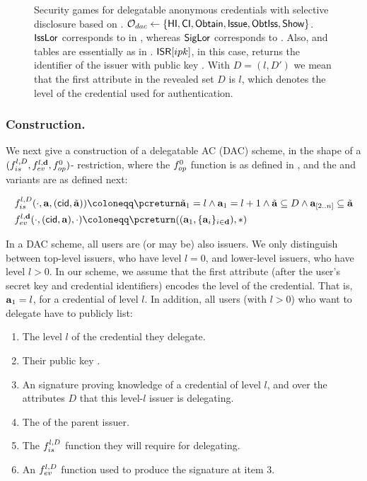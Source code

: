 \begin{figure}[ht!]
{  }
  \caption{Security games for delegatable anonymous credentials with selective
    disclosure based on \cite{fhs19}. $\mathcal{O}_{dac} \gets \lbrace
    \mathsf{HI},\mathsf{CI},\mathsf{Obtain},\mathsf{Issue},\mathsf{ObtIss},
    \mathsf{Show}\rbrace$. $\mathsf{IssLor}$ corresponds to \OBTCHALb in \UAS,
    whereas $\mathsf{SigLor}$ corresponds to \CHALb. Also, \OWNR
    and \ATTR tables are essentially as in .
    $\mathsf{ISR}[ipk]$, in this case, returns the identifier of the issuer with public
    key \ipk. With $D = (l,D')$ we mean that the first attribute in the revealed
    set $D$ is $l$, which denotes the level of the credential used for
    authentication.}
  \label{fig:model-dac}  
\end{figure}

\subsubsection{\CUASDAC Construction.} %
We next give a construction of a delegatable AC (DAC) scheme, in the shape of
a $(f_{is}^{l,D},f_{ev}^{l,\mathbf{d}},f_{op}^0)$-\CUASGenInt
restriction, where the $f_{op}^0$ function is as defined in
, and the \fissue and \feval variants are as
defined next:

\begin{align}
  & \fissue^{l,D}(\cdot,\attrs,(\cid,\cattrs)) \coloneqq
    \pcreturn \cattrs_1 = l \land \attrs_1 = l+1
    \land \cattrs \subseteq D \land \attrs_{[2..n]} \subseteq \cattrs \nonumber \\
  & \feval^{l,\dattrs}(\cdot,(\cid,\attrs),\cdot) \coloneqq
    \pcreturn((\attrs_1,\lbrace\attrs_i\rbrace_{i\in\dattrs}),\ast)
    \label{eq:funcs-dac}
\end{align}

In a DAC scheme, all users are (or may be) also issuers. We only
distinguish between top-level issuers, who have level $l=0$, and lower-level
issuers, who have level $l>0$. In our \CUASDAC scheme, we assume that the first
attribute (after the user's secret key and credential identifiers) encodes the
level of the credential. That is, $\mathbf{a}_1=l$, for a credential of level $l$.
In addition, all users (with $l>0$) who want to delegate have to publicly
list:

\begin{enumerate}
\item The level $l$ of the credential they delegate.
\item Their public key \ipk.
\item An \UAS signature proving knowledge of a credential of level $l$, and over
  the attributes $D$ that this level-$l$ issuer is delegating.
\item The \ipk of the parent issuer.
\item The $f_{is}^{l,D}$ function they will require for delegating.
\item An $f_{ev}^{l,D}$ function used to produce the signature at item 3.
\end{enumerate}

